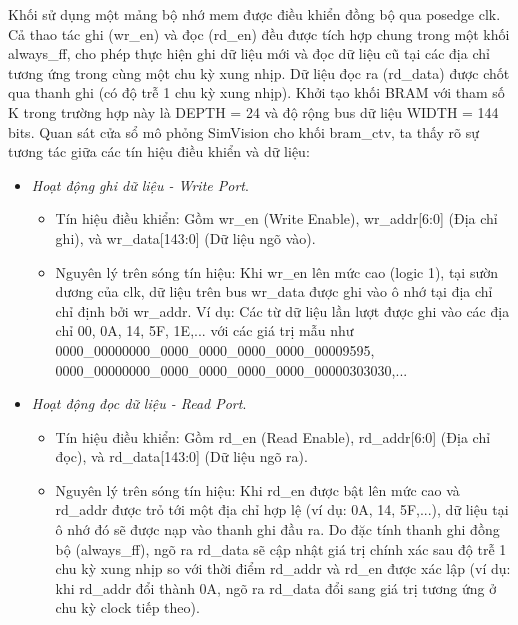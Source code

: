 \documentclass[12pt,a4paper,oneside]{book}
\begin{document}
Khối sử dụng một mảng bộ nhớ mem được điều khiển đồng bộ qua posedge clk. Cả thao tác ghi (wr\_en) và đọc (rd\_en) đều được tích hợp chung trong một khối always\_ff, cho phép thực hiện ghi dữ liệu mới và đọc dữ liệu cũ tại các địa chỉ tương ứng trong cùng một chu kỳ xung nhịp. Dữ liệu đọc ra (rd\_data) được chốt qua thanh ghi (có độ trễ 1 chu kỳ xung nhịp). Khởi tạo khối BRAM với tham số K trong trường hợp này là DEPTH = 24 và độ rộng bus dữ liệu WIDTH = 144 bits. Quan sát cửa sổ mô phỏng SimVision cho khối bram\_ctv, ta thấy rõ sự tương tác giữa các tín hiệu điều khiển và dữ liệu:
\begin{itemize}
    \item \textit{Hoạt động ghi dữ liệu - Write Port}. 
    \begin{itemize}
        \item Tín hiệu điều khiển: Gồm wr\_en (Write Enable), wr\_addr[6:0] (Địa chỉ ghi), và wr\_data[143:0] (Dữ liệu ngõ vào).
        \item Nguyên lý trên sóng tín hiệu: Khi wr\_en lên mức cao (logic 1), tại sườn dương của clk, dữ liệu trên bus wr\_data được ghi vào ô nhớ tại địa chỉ chỉ định bởi wr\_addr. Ví dụ: Các từ dữ liệu lần lượt được ghi vào các địa chỉ 00, 0A, 14, 5F, 1E,... với các giá trị mẫu như 0000\_00000000\_0000\_0000\_0000\_0000\_00009595, 0000\_00000000\_0000\_0000\_0000\_0000\_00000303030,...
    \end{itemize}
    \item \textit{Hoạt động đọc dữ liệu - Read Port}.
    \begin{itemize}
        \item Tín hiệu điều khiển: Gồm rd\_en (Read Enable), rd\_addr[6:0] (Địa chỉ đọc), và rd\_data[143:0] (Dữ liệu ngõ ra).
        \item Nguyên lý trên sóng tín hiệu: Khi rd\_en được bật lên mức cao và rd\_addr được trỏ tới một địa chỉ hợp lệ (ví dụ: 0A, 14, 5F,...), dữ liệu tại ô nhớ đó sẽ được nạp vào thanh ghi đầu ra. Do đặc tính thanh ghi đồng bộ (always\_ff), ngõ ra rd\_data sẽ cập nhật giá trị chính xác sau độ trễ 1 chu kỳ xung nhịp so với thời điểm rd\_addr và rd\_en được xác lập (ví dụ: khi rd\_addr đổi thành 0A, ngõ ra rd\_data đổi sang giá trị tương ứng ở chu kỳ clock tiếp theo).
    \end{itemize}
\end{itemize}
\end{document}
